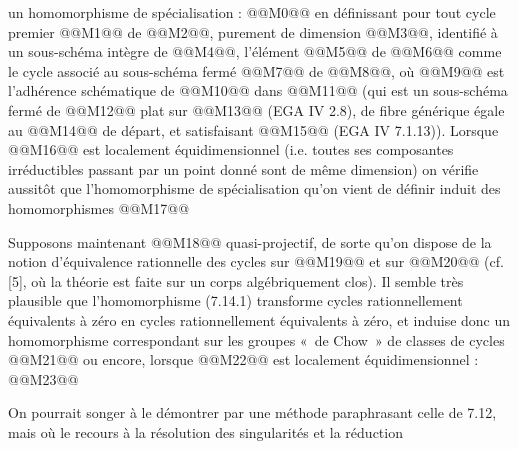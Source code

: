 
un homomorphisme de spécialisation :
@@M0@@
en définissant pour tout cycle premier @@M1@@ de @@M2@@, purement de dimension @@M3@@, identifié à un sous-schéma intègre de @@M4@@, l'élément @@M5@@ de @@M6@@ comme le cycle associé au sous-schéma fermé @@M7@@ de @@M8@@, où @@M9@@ est l'adhérence schématique de @@M10@@ dans @@M11@@ (qui est un sous-schéma fermé de @@M12@@ plat sur @@M13@@ (EGA IV 2.8), de fibre générique égale au @@M14@@ de départ, et satisfaisant @@M15@@ (EGA IV 7.1.13)). Lorsque @@M16@@ est localement équidimensionnel (i.e. toutes ses composantes irréductibles passant par un point donné sont de même dimension) on vérifie aussitôt que l'homomorphisme de spécialisation qu'on vient de définir induit des homomorphismes
@@M17@@

Supposons maintenant @@M18@@ quasi-projectif, de sorte qu'on dispose de la notion d'équivalence rationnelle des cycles sur @@M19@@ et sur @@M20@@ (cf. [5], où la théorie est faite sur un corps algébriquement clos). Il semble très plausible que l'homomorphisme (7.14.1) transforme cycles rationnellement équivalents à zéro en cycles rationnellement équivalents à zéro, et induise donc un homomorphisme correspondant sur les groupes «~de Chow~» de classes de cycles
@@M21@@
ou encore, lorsque @@M22@@ est localement équidimensionnel :
@@M23@@

On pourrait songer à le démontrer par une méthode paraphrasant celle de 7.12, mais où le recours à la résolution des singularités et la réduction
